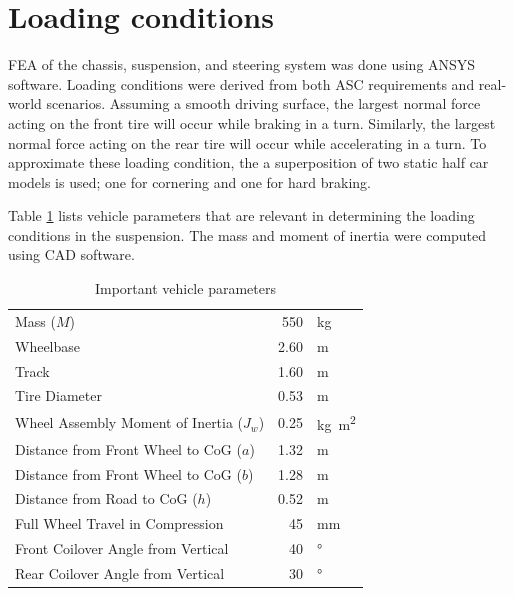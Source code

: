 \documentclass[10pt]{article}
\begin{document}

\clearpage
\appendix
\section{Loading conditions}
\label{sec:loading-conditions}
FEA of the chassis, suspension, and steering system was done using ANSYS software. Loading conditions were derived from both ASC requirements and real-world scenarios. Assuming a smooth driving surface, the largest normal force acting on the front tire will occur while braking in a turn. Similarly, the largest normal force acting on the rear tire will occur while accelerating in a turn. To approximate these loading condition, the a superposition of two static half car models is used; one for cornering and one for hard braking.

Table \ref{tab:loading-conditions-params} lists vehicle parameters that are relevant in determining the loading conditions in the suspension. The mass and moment of inertia were computed using CAD software. 

\begin{table}
\centering
\begin{tabular}{lrl}
\toprule
Mass ($M$)                                  &  550 & \si{\kilo\gram}              \\
Wheelbase                                   & 2.60 & \si{\metre}                  \\
Track                                       & 1.60 & \si{\metre}                  \\
Tire Diameter                               & 0.53 & \si{\metre}                  \\
Wheel Assembly Moment of Inertia ($J_w$)    & 0.25 & \si{\kilogram\metre\squared} \\
Distance from Front Wheel to CoG ($a$)      & 1.32 & \si{\metre}                  \\
Distance from Front Wheel to CoG ($b$)      & 1.28 & \si{\metre}                  \\
Distance from Road to CoG ($h$)             & 0.52 & \si{\metre}                  \\
Full Wheel Travel in Compression            &   45 & \si{\milli\metre}            \\
Front Coilover Angle from Vertical          &   40 & \si{\degree}                 \\
Rear Coilover Angle from Vertical           &   30 & \si{\degree}                 \\
\bottomrule
\end{tabular}
\caption{Important vehicle parameters}
\label{tab:loading-conditions-params}
\end{table}
\end{document}
